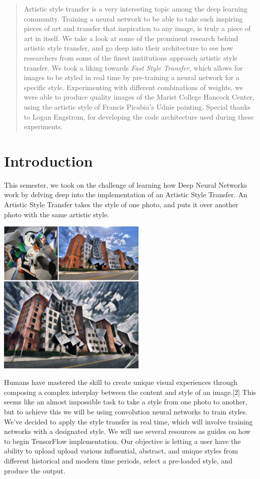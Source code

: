 \documentclass[12pt]{article}
\begin{document}
\begin{abstract}
 Artistic style transfer is a very interesting topic among the deep learning community. Training a neural network to be able to take such inspiring pieces of art and transfer that inspiration to any image, is truly a piece of art in itself. We take a look at some of the prominent research behind artistic style transfer, and go deep into their architecture to see how researchers from some of the finest institutions approach artistic style transfer. We took a liking towards \textit{Fast Style Transfer}, which allows for images to be styled in real time by pre-training a neural network for a specific style. Experimenting with different combinations of weights, we were able to produce quality images of the Marist College Hancock Center, using the artistic style of Francis Picabia's Udnie painting. Special thanks to Logan Engstrom, for developing the code architecture used during these experiments. \cite{Engstrom}
\end{abstract}

\section{Introduction}
This semester, we took on the challenge of learning how Deep Neural Networks work by delving deep into the implementation of an Artistic Style Transfer. An Artistic Style Transfer takes the style of one photo,
and puts it over another photo with the same artistic style. 

\begin{center}
  \includegraphics[height=75mm]{visuals/milestone_example.png}
\end{center}

Humans have mastered the skill to create unique visual experiences through composing a complex interplay between the content and style of an image.[2]
This seems like an almost impossible task to take a style from one photo to another, but to achieve this we will be using convolution neural networks to train styles. 
We've decided to apply the style transfer in real time, which will involve training networks with a designated style. We will use several resources as guides on how to begin TensorFlow implementation. Our objective is letting a user have the ability to upload upload various influential, abstract, and unique styles from different historical and modern time periods, select a pre-loaded style, and produce the output.
\end{document}
